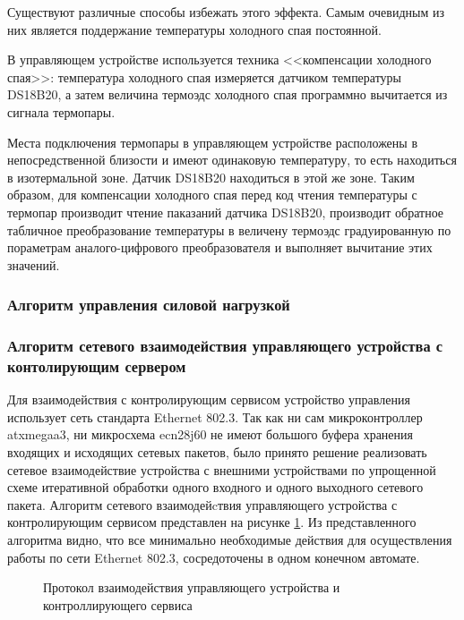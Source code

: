 Существуют различные способы избежать этого эффекта. Самым очевидным из них является поддержание
температуры холодного спая постоянной.

В управляющем устройстве используется техника <<компенсации холодного спая>>: температура холодного спая
измеряется датчиком температуры DS18B20, а затем величина термоэдс холодного спая программно
вычитается из сигнала термопары.

Места подключения термопары в управляющем устройстве расположены в непосредственной близости и имеют одинаковую
температуру, то есть находиться в изотермальной зоне. Датчик DS18B20 находиться в этой же зоне. Таким образом,
для компенсации холодного спая перед код чтения температуры с термопар производит чтение паказаний датчика DS18B20,
производит обратное табличное преобразование температуры в величену термоэдс градуированную по пораметрам
аналого-цифрового преобразователя и выполняет вычитание этих значений.

\subsubsection{Алгоритм управления силовой нагрузкой}

\subsubsection{Алгоритм сетевого взаимодействия управляющего устройства
с контолирующим сервером}
Для взаимодействия с контролирующим сервисом устройство управления использует сеть
стандарта Ethernet 802.3. Так как ни сам микроконтроллер at\-x\-mega\-a3, ни микросхема
ecn28j60 не имеют большого буфера хранения входящих и исходящих сетевых пакетов,
было принято решение реализовать сетевое взаимодействие устройства с внешними устройствами
по упрощенной схеме итеративной обработки одного входного и одного выходного сетевого
пакета. Алгоритм сетевого взаимодейcтвия управляющего устройства с контролирующим сервисом представлен
на рисунке \ref{img:devProto}. Из представленного алгоритма видно, что все минимально необходимые
действия для осуществления работы по сети Ethernet 802.3, сосредоточены в одном конечном автомате.

\begin{figure}[h]
	\caption{Протокол взаимодействия управляющего устройства и контроллирующего сервиса}
	\label{img:devProto}
\end{figure}

